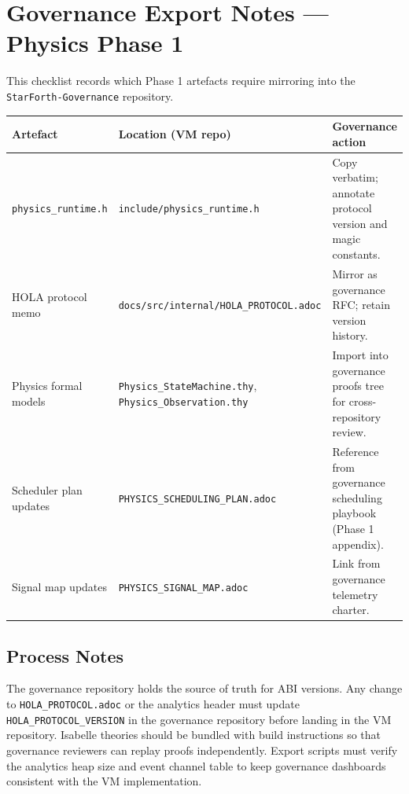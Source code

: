 
\section{Governance Export Notes --- Physics Phase 1}

This checklist records which Phase 1 artefacts require mirroring into the
\texttt{StarForth-Governance} repository.

\begin{center}
\begin{tabular}{p{3.5cm}p{4.5cm}p{5cm}}
\toprule
Artefact & Location (VM repo) & Governance action \\
\midrule
\texttt{physics\_runtime.h} & \texttt{include/physics\_runtime.h} &
  Copy verbatim; annotate protocol version and magic constants. \\
HOLA protocol memo & \texttt{docs/src/internal/HOLA\_PROTOCOL.adoc} &
  Mirror as governance RFC; retain version history. \\
Physics formal models &
  \texttt{Physics\_StateMachine.thy}, \texttt{Physics\_Observation.thy} &
  Import into governance proofs tree for cross-repository review. \\
Scheduler plan updates & \texttt{PHYSICS\_SCHEDULING\_PLAN.adoc} &
  Reference from governance scheduling playbook (Phase 1 appendix). \\
Signal map updates & \texttt{PHYSICS\_SIGNAL\_MAP.adoc} &
  Link from governance telemetry charter. \\
\bottomrule
\end{tabular}
\end{center}

\subsection{Process Notes}

The governance repository holds the source of truth for ABI versions. Any change to
\texttt{HOLA\_PROTOCOL.adoc} or the analytics header must update
\texttt{HOLA\_PROTOCOL\_VERSION} in the governance repository before landing in the VM
repository. Isabelle theories should be bundled with build instructions so that
governance reviewers can replay proofs independently. Export scripts must verify the
analytics heap size and event channel table to keep governance dashboards consistent
with the VM implementation.

